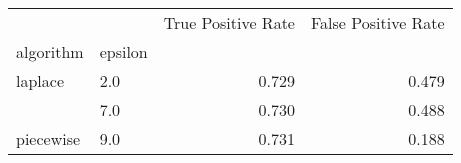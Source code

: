 \begin{tabular}{llrr}
\toprule
          &     &  True Positive Rate &  False Positive Rate \\
algorithm & epsilon &                     &                      \\
\midrule
laplace & 2.0 &               0.729 &                0.479 \\
          & 7.0 &               0.730 &                0.488 \\
piecewise & 9.0 &               0.731 &                0.188 \\
\bottomrule
\end{tabular}
